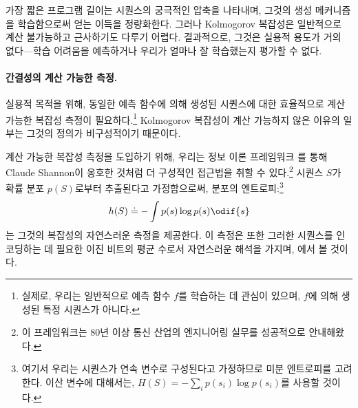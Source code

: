 \documentclass[../../book-main_ko.tex]{subfiles}
\begin{document}
가장 짧은 프로그램 길이는 시퀀스의 궁극적인 압축을 나타내며, 그것의 생성 메커니즘을 학습함으로써 얻는 이득을 정량화한다. 그러나 Kolmogorov 복잡성은 일반적으로 계산 불가능하고 \cite{Cover-Thomas} 근사하기도 다루기 어렵다. 결과적으로, 그것은 실용적 용도가 거의 없다---학습 어려움을 예측하거나 우리가 얼마나 잘 학습했는지 평가할 수 없다.


\paragraph{간결성의 계산 가능한 측정.}
실용적 목적을 위해, 동일한 예측 함수에 의해 생성된 시퀀스에 대한 효율적으로 계산 가능한 복잡성 측정이 필요하다.\footnote{실제로, 우리는 일반적으로 예측 함수 \(f\)를 학습하는 데 관심이 있으며, \(f\)에 의해 생성된 특정 시퀀스가 아니다.} Kolmogorov 복잡성이 계산 가능하지 않은 이유의 일부는 그것의 정의가 비구성적이기 때문이다.

계산 가능한 복잡성 측정을 도입하기 위해, 우리는 정보 이론 프레임워크 \cite{Shannon-1948,Cover-Thomas}를 통해 Claude Shannon이 옹호한 것처럼 더 구성적인 접근법을 취할 수 있다.\footnote{이 프레임워크는 80년 이상 통신 산업의 엔지니어링 실무를 성공적으로 안내해왔다.} 시퀀스 \(S\)가 확률 분포 \(p(S)\)로부터 추출된다고 가정함으로써, 분포의 엔트로피:\footnote{여기서 우리는 시퀀스가 연속 변수로 구성된다고 가정하므로 미분 엔트로피를 고려한다. 이산 변수에 대해서는, \(H(S) = - \sum_{i}p(s_{i}) \log p(s_{i})\)를 사용할 것이다.}
\begin{equation}
    h(S) \doteq -\int p(s) \log p(s) \odif{s}
    \label{eqn:entropy-definition}
\end{equation}
는 그것의 복잡성의 자연스러운 측정을 제공한다. 이 측정은 또한 그러한 시퀀스를 인코딩하는 데 필요한 이진 비트의 평균 수로서 자연스러운 해석을 가지며, 에서 볼 것이다.
\end{document}
